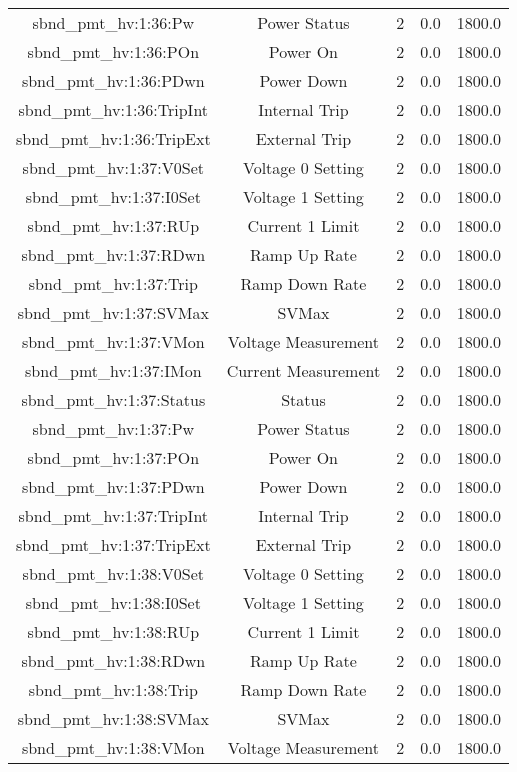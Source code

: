 \begin{table}[ptb]
\begin{tabular}{c | c c c c}
sbnd_pmt_hv:1:36:Pw & Power Status & 2 & 0.0 & 1800.0\\ 
sbnd_pmt_hv:1:36:POn & Power On & 2 & 0.0 & 1800.0\\ 
sbnd_pmt_hv:1:36:PDwn & Power Down & 2 & 0.0 & 1800.0\\ 
sbnd_pmt_hv:1:36:TripInt & Internal Trip & 2 & 0.0 & 1800.0\\ 
sbnd_pmt_hv:1:36:TripExt & External Trip & 2 & 0.0 & 1800.0\\ 
sbnd_pmt_hv:1:37:V0Set & Voltage 0 Setting & 2 & 0.0 & 1800.0\\ 
sbnd_pmt_hv:1:37:I0Set & Voltage 1 Setting & 2 & 0.0 & 1800.0\\ 
sbnd_pmt_hv:1:37:RUp & Current 1 Limit & 2 & 0.0 & 1800.0\\ 
sbnd_pmt_hv:1:37:RDwn & Ramp Up Rate & 2 & 0.0 & 1800.0\\ 
sbnd_pmt_hv:1:37:Trip & Ramp Down Rate & 2 & 0.0 & 1800.0\\ 
sbnd_pmt_hv:1:37:SVMax & SVMax & 2 & 0.0 & 1800.0\\ 
sbnd_pmt_hv:1:37:VMon & Voltage Measurement & 2 & 0.0 & 1800.0\\ 
sbnd_pmt_hv:1:37:IMon & Current Measurement & 2 & 0.0 & 1800.0\\ 
sbnd_pmt_hv:1:37:Status & Status & 2 & 0.0 & 1800.0\\ 
sbnd_pmt_hv:1:37:Pw & Power Status & 2 & 0.0 & 1800.0\\ 
sbnd_pmt_hv:1:37:POn & Power On & 2 & 0.0 & 1800.0\\ 
sbnd_pmt_hv:1:37:PDwn & Power Down & 2 & 0.0 & 1800.0\\ 
sbnd_pmt_hv:1:37:TripInt & Internal Trip & 2 & 0.0 & 1800.0\\ 
sbnd_pmt_hv:1:37:TripExt & External Trip & 2 & 0.0 & 1800.0\\ 
sbnd_pmt_hv:1:38:V0Set & Voltage 0 Setting & 2 & 0.0 & 1800.0\\ 
sbnd_pmt_hv:1:38:I0Set & Voltage 1 Setting & 2 & 0.0 & 1800.0\\ 
sbnd_pmt_hv:1:38:RUp & Current 1 Limit & 2 & 0.0 & 1800.0\\ 
sbnd_pmt_hv:1:38:RDwn & Ramp Up Rate & 2 & 0.0 & 1800.0\\ 
sbnd_pmt_hv:1:38:Trip & Ramp Down Rate & 2 & 0.0 & 1800.0\\ 
sbnd_pmt_hv:1:38:SVMax & SVMax & 2 & 0.0 & 1800.0\\ 
sbnd_pmt_hv:1:38:VMon & Voltage Measurement & 2 & 0.0 & 1800.0\\ 

\end{tabular}
\end{table}
